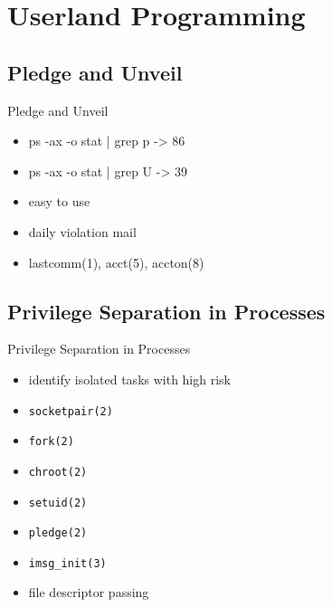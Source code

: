 \documentclass[14pt,aspectratio=169]{beamer}
\begin{document}
\section{Userland Programming}

\subsection{Pledge and Unveil}
\begin{frame}{Pledge and Unveil}
\begin{itemize}
  \item ps -ax -o stat | grep p -> 86%
  \item ps -ax -o stat | grep U -> 39%
  \item easy to use
  \item daily violation mail
  \item lastcomm(1), acct(5), accton(8)
\end{itemize}
\end{frame}

\subsection{Privilege Separation in Processes}
\begin{frame}{Privilege Separation in Processes}
\begin{itemize}
  \item identify isolated tasks with high risk
  \item \texttt{socketpair(2)}
  \item \texttt{fork(2)}
  \item \texttt{chroot(2)}
  \item \texttt{setuid(2)}
  \item \texttt{pledge(2)}
  \item \texttt{imsg\_init(3)}
  \item file descriptor passing
\end{itemize}
\end{frame}
\end{document}
